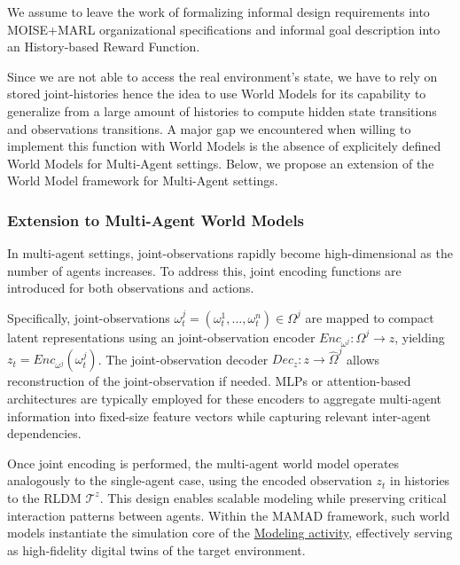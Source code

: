 \documentclass[pdflatex,sn-mathphys-num]{sn-jnl}%
\theoremstyle{thmstyleone}%
\theoremstyle{thmstyletwo}%
\theoremstyle{thmstylethree}%
\begin{document}
We assume to leave the work of formalizing informal design requirements into MOISE+MARL organizational specifications and informal goal description into an History-based Reward Function.

Since we are not able to access the real environment's state, we have to rely on stored joint-histories hence the idea to use World Models for its capability to generalize from a large amount of histories to compute hidden state transitions and observations transitions.
A major gap we encountered when willing to implement this function with World Models is the absence of explicitely defined World Models for Multi-Agent settings. Below, we propose an extension of the World Model framework for Multi-Agent settings.

\subsubsection*{Extension to Multi-Agent World Models}

In multi-agent settings, joint-observations rapidly become high-dimensional as the number of agents increases. To address this, joint encoding functions are introduced for both observations and actions.

Specifically, joint-observations $\omega_t^{j} = (\omega_t^1, \dots, \omega_t^n) \in \Omega^{j}$ are mapped to compact latent representations using an joint-observation encoder $Enc_{\omega^j}: \Omega^{j} \rightarrow z$, yielding $z_t = Enc_{\omega^j}(\omega_t^{j})$. The joint-observation decoder $Dec_{z}: z \rightarrow \hat{\Omega}^{j}$ allows reconstruction of the joint-observation if needed.
%
MLPs or attention-based architectures are typically employed for these encoders to aggregate multi-agent information into fixed-size feature vectors while capturing relevant inter-agent dependencies.

Once joint encoding is performed, the multi-agent world model operates analogously to the single-agent case, using the encoded observation $z_t$ in histories to the RLDM $\mathcal{T}^{z}$. This design enables scalable modeling while preserving critical interaction patterns between agents. Within the MAMAD framework, such world models instantiate the simulation core of the \hyperref[sec:modelling]{Modeling activity}, effectively serving as high-fidelity digital twins of the target environment.

\
\end{document}
